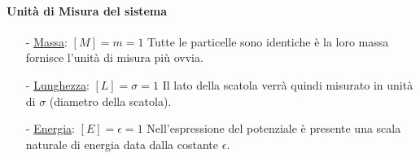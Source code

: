 \documentclass[11pt]{article}
\theoremstyle{plain}
\theoremstyle{remark}
\begin{document}
\paragraph{Unità di Misura del sistema}
\begin{itemize}
\item[-] \underline{Massa}: $[M]=m=1$ 
\newline Tutte le particelle sono identiche è la loro massa fornisce l'unità di misura più ovvia.

\item[-] \underline{Lunghezza}: $[L]=\sigma=1$ 
\newline Il lato della scatola verrà quindi misurato in unità di $\sigma$ (diametro della scatola).

\item[-] \underline{Energia}: $[E]=\epsilon=1$ 
\newline Nell'espressione del potenziale è presente una scala naturale di energia data dalla costante $\epsilon$.
\end{itemize}
\end{document}
